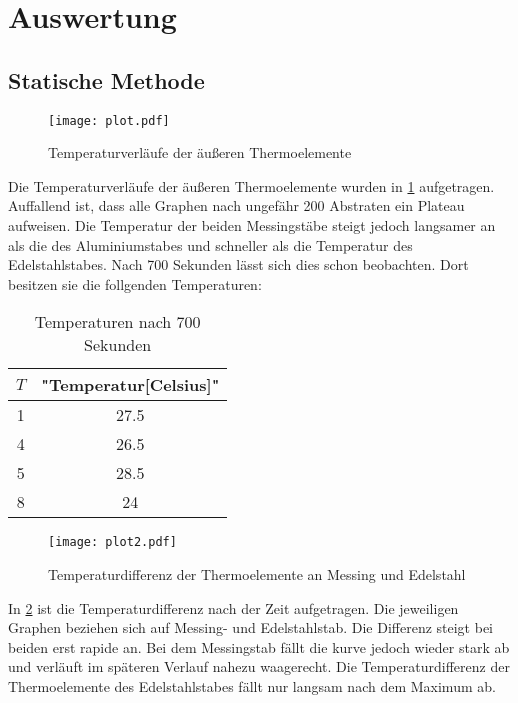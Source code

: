 \section{Auswertung}
\label{sec:Auswertung}
\subsection{Statische Methode}
\begin{figure}
    \centering
    \texttt{[image: plot.pdf]}
    \caption{Temperaturverläufe der äußeren Thermoelemente}
    \label{fig:plot}
\end{figure}
Die Temperaturverläufe der äußeren Thermoelemente wurden in \ref{fig:plot} aufgetragen.
Auffallend ist, dass alle Graphen nach ungefähr 200 Abstraten ein Plateau aufweisen.
Die Temperatur der beiden Messingstäbe steigt jedoch langsamer an als die des Aluminiumstabes und schneller als die Temperatur des Edelstahlstabes.
%
Nach 700 Sekunden lässt sich dies schon beobachten.
Dort besitzen sie die follgenden Temperaturen:
\begin{table}
    \centering
    \caption{Temperaturen nach 700 Sekunden}
    \label{tab:t_1}
    \begin{tabular}{c c}
        \toprule
        $T$ & "Temperatur[Celsius]" \\
        \midrule
        1 & 27.5 \\
        4 & 26.5 \\
        5 & 28.5 \\
        8 & 24 \\
        \bottomrule
    \end{tabular}
\end{table}
\begin{figure}
    \centering
    \texttt{[image: plot2.pdf]}
    \caption{Temperaturdifferenz der Thermoelemente an Messing und Edelstahl}
    \label{fig:plot2}
\end{figure}
%
In \ref{fig:plot2} ist die Temperaturdifferenz nach der Zeit aufgetragen.
Die jeweiligen Graphen beziehen sich auf Messing- und Edelstahlstab.
Die Differenz steigt bei beiden erst rapide an.
Bei dem Messingstab fällt die kurve jedoch wieder stark ab und verläuft im späteren Verlauf nahezu waagerecht.
Die Temperaturdifferenz der Thermoelemente des Edelstahlstabes fällt nur langsam nach dem Maximum ab.
